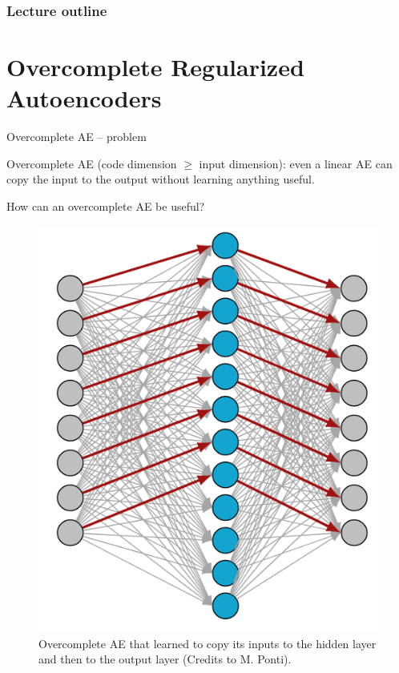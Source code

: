 
 








\begin{frame}
\frametitle{Lecture outline}
\tableofcontents
\end{frame}

\section{Overcomplete Regularized Autoencoders}


\begin{vbframe}{Overcomplete AE -- problem}

  Overcomplete AE (code dimension $\geq$ input dimension): even a linear AE can copy the input to the output without learning anything useful.

  \vspace{0.2cm}

  How can an overcomplete AE be useful?
 
 \vspace*{-0.3cm}
\begin{figure}[h]
    \centering
    \includegraphics[width=0.35\linewidth]{plots/AE_overcomplete2.png}
    \caption{Overcomplete AE that learned to copy its inputs to the hidden layer and then to the output layer (Credits to M. Ponti).} 
\end{figure}
    
    
\end{vbframe}



  
  

